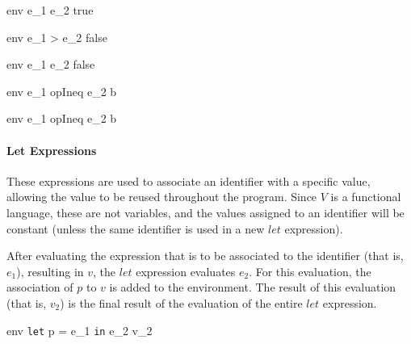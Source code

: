 \documentclass{article}
\begin{document}
    {\mbox{env} \vdash e_1 \leq e_2 \Downarrow true}

    {\mbox{env} \vdash e_1 > e_2 \Downarrow false}

    {\mbox{env} \vdash e_1 \geq e_2 \Downarrow false}

\medskip

\medskip

    {\mbox{env} \vdash e_1 \; opIneq \; e_2 \Downarrow b}

    {\mbox{env} \vdash e_1 \; opIneq \; e_2 \Downarrow b}

\paragraph{Let Expressions}
These expressions are used to associate an identifier with a specific value, allowing the value to be reused throughout the program.
Since $V$ is a functional language, these are not variables, and the values assigned to an identifier will be constant (unless the same identifier is used in a new $let$ expression).

After evaluating the expression that is to be associated to the identifier (that is, $e_1$), resulting in $v$, the $let$ expression evaluates $e_2$.
For this evaluation, the association of $p$ to $v$ is added to the environment.
The result of this evaluation (that is, $v_2$) is the final result of the evaluation of the entire $let$ expression.

    {\mbox{env} \vdash \texttt{let} \; p = e_1 \; \texttt{in} \; e_2 \Downarrow v_2}
\end{document}
